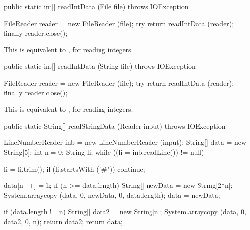 \begin{htmlonly}
\end{htmlonly}
\begin{code}

   public static int[] readIntData (File file) throws IOException\begin{hide} {
      FileReader reader = new FileReader (file);
      try {
         return readIntData (reader);
      }
      finally {
         reader.close();
      }
   }\end{hide}
\end{code}
\begin{tabb}   This is equivalent to ,
   for reading integers.
\end{tabb}
\begin{htmlonly}
\end{htmlonly}
\begin{code}

   public static int[] readIntData (String file) throws IOException\begin{hide} {
      FileReader reader = new FileReader (file);
      try {
         return readIntData (reader);
      }
      finally {
         reader.close();
      }
   }\end{hide}
\end{code}
\begin{tabb}   This is equivalent to ,
   for reading integers.
\end{tabb}
\begin{htmlonly}
\end{htmlonly}
\begin{code}

   public static String[] readStringData (Reader input) throws IOException\begin{hide} {
      LineNumberReader inb = new LineNumberReader (input);
      String[] data = new String[5];
      int n = 0;
      String li;
      while ((li = inb.readLine()) != null) {
        li = li.trim();
        if (li.startsWith ("#"))
           continue;

        data[n++] = li;
        if (n >= data.length) {
           String[] newData = new String[2*n];
           System.arraycopy (data, 0, newData, 0, data.length);
           data = newData;
        }
      }
      if (data.length != n) {
         String[] data2 = new String[n];
         System.arraycopy (data, 0, data2, 0, n);
         return data2;
      }
      return data;
   }\end{hide}
\end{code}
